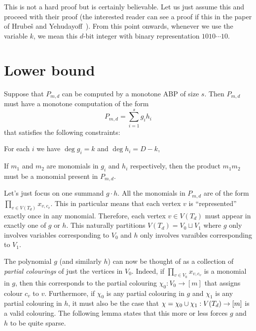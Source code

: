 This is not a hard proof but is certainly believable. Let us just assume this and proceed with their proof (the interested reader can see a proof if this in the paper of Hrube\v{s} and Yehudayoff~\cite{HY16}). From this point onwards, whenever we use the variable $k$, we mean this $d$-bit integer with binary representation $1010\cdots10$. 

\section{Lower bound}

Suppose that $P_{m,d}$ can be computed by a monotone ABP of size $s$. Then $P_{m,d}$ must have a monotone computation of the form
\[
P_{m,d} = \sum_{i=1}^s g_i h_i
\]
that satisfies the following constraints:
\begin{description}
  \itemsep 0pt
\item [Degree constraints] For each $i$ we have $\deg g_i = k$ and $\deg h_i = D - k$,
\item [Monotonicity] If $m_1$ and $m_2$ are monomials in $g_i$ and $h_i$ respectively, then the product $m_1m_2$ must be a monomial present in $P_{m,d}$.
\end{description}

Let's just focus on one summand $g \cdot h$. 
All the monomials in $P_{m,d}$ are of the form $\prod_{v\in V(T_d)}{x_{v,c_v}}$. This in particular means that each vertex $v$ is ``represented'' exactly once in any monomial. Therefore, each vertex $v\in V(T_d)$ must appear in exactly one of $g$ or $h$. This naturally partitions $V(T_d) = V_0 \sqcup V_1$ where $g$ only involves variables corresponding to $V_0$ and $h$ only involves varaibles corresponding to $V_1$.

The polynomial $g$ (and similarly $h$) can now be thought of as a collection of \emph{partial colourings} of just the vertices in $V_0$. Indeed, if $\prod_{v\in V_0} x_{v,c_v}$ is a monomial in $g$, then this corresponds to the partial colouring $\chi_0: V_0 \rightarrow [m]$ that assigns colour $c_v$ to $v$. Furthermore, if $\chi_0$ is any partial colouring in $g$ and $\chi_1$ is any partial colouring in $h$, it must also be the case that $\chi = \chi_0 \cup \chi_1:V(T_d)\rightarrow[m]$ is a valid colouring. The following lemma states that this more or less forces $g$ and $h$ to be quite sparse.

